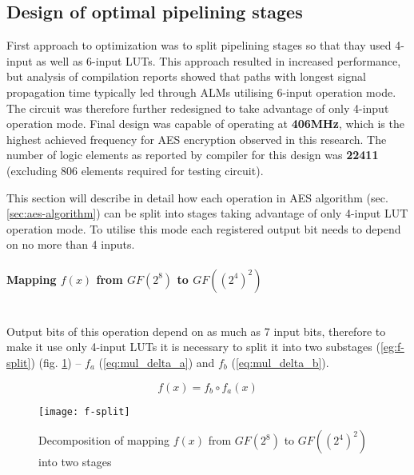 

\subsection{Design of optimal pipelining stages}
\label{sec:pipeline-stages-design}

First approach to optimization was to split pipelining stages so that thay used 4-input as well as 6-input LUTs. This approach resulted in increased performance, but analysis of compilation reports showed that paths with longest signal propagation time typically led through ALMs utilising 6-input operation mode. The circuit was therefore further redesigned to take advantage of only 4-input operation mode. Final design was capable of operating at \textbf{406MHz}, which is the highest achieved frequency for AES encryption observed in this research. The number of logic elements as reported by compiler for this design was \textbf{22411} (excluding 806 elements required for testing circuit).

This section will describe in detail how each operation in AES algorithm (sec. \ref{sec:aes-algorithm}) can be split into stages taking advantage of only 4-input LUT operation mode. To utilise this mode each registered output bit needs to depend on no more than 4 inputs.



\paragraph{Mapping $f(x)$ from $GF(2^8)$ to $GF((2^4)^2)$}\mbox{}\\
Output bits of this operation depend on as much as 7 input bits, therefore to make it use only 4-input LUTs it is necessary to split it into two substages (\ref{eg:f-split}) (fig. \ref{fig:f-split}) -- $f_a$ (\ref{eq:mul_delta_a}) and $f_b$ (\ref{eq:mul_delta_b}).

\begin{equation}
\label{eg:f-split}
f(x) = f_b \circ f_a(x)
\end{equation}

\begin{figure}[!h]
\centering
\texttt{[image: f-split]}
\caption{Decomposition of mapping $f(x)$ from $GF(2^8)$ to $GF((2^4)^2)$ into two stages}
\label{fig:f-split}
\end{figure}

